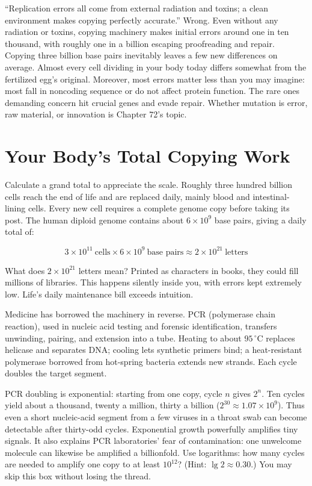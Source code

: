 \begin{wuqu}
``Replication errors all come from external radiation and toxins; a clean environment makes copying perfectly accurate.'' Wrong. Even without any radiation or toxins, copying machinery makes initial errors around one in ten thousand, with roughly one in a billion escaping proofreading and repair. Copying three billion base pairs inevitably leaves a few new differences on average. Almost every cell dividing in your body today differs somewhat from the fertilized egg's original. Moreover, most errors matter less than you may imagine: most fall in noncoding sequence or do not affect protein function. The rare ones demanding concern hit crucial genes and evade repair. Whether mutation is error, raw material, or innovation is Chapter 72's topic.
\end{wuqu}

\section{Your Body's Total Copying Work}

Calculate a grand total to appreciate the scale. Roughly three hundred billion cells reach the end of life and are replaced daily, mainly blood and intestinal-lining cells. Every new cell requires a complete genome copy before taking its post. The human diploid genome contains about $6\times10^{9}$ base pairs, giving a daily total of:

\[3\times10^{11}\ \text{cells}\times 6\times10^{9}\ \text{base pairs}\approx 2\times10^{21}\ \text{letters}\]

What does $2\times10^{21}$ letters mean? Printed as characters in books, they could fill millions of libraries. This happens silently inside you, with errors kept extremely low. Life's daily maintenance bill exceeds intuition.

Medicine has borrowed the machinery in reverse. PCR (polymerase chain reaction), used in nucleic acid testing and forensic identification, transfers unwinding, pairing, and extension into a tube. Heating to about $95\,^{\circ}\mathrm{C}$ replaces helicase and separates DNA; cooling lets synthetic primers bind; a heat-resistant polymerase borrowed from hot-spring bacteria extends new strands. Each cycle doubles the target segment.

\begin{tiaozhan}
PCR doubling is exponential: starting from one copy, cycle $n$ gives $2^{n}$. Ten cycles yield about a thousand, twenty a million, thirty a billion ($2^{30}\approx1.07\times10^{9}$). Thus even a short nucleic-acid segment from a few viruses in a throat swab can become detectable after thirty-odd cycles. Exponential growth powerfully amplifies tiny signals. It also explains PCR laboratories' fear of contamination: one unwelcome molecule can likewise be amplified a billionfold. Use logarithms: how many cycles are needed to amplify one copy to at least $10^{12}$? (Hint: $\lg 2\approx0.30$.) You may skip this box without losing the thread.
\end{tiaozhan}

